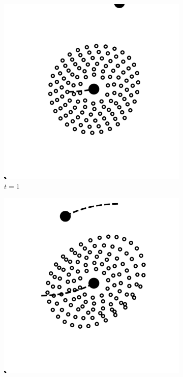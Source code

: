 \documentclass[11pt,twocolumn]{article}
\begin{document}
            \begin{figure}[!htbp]
            \captionsetup[subfigure]{labelformat=empty}
  			\begin{subfigure}[b]{0.2\textwidth}
    			\includegraphics[width=\textwidth]{fig_1/Fig3_1_000000_0.pdf}
    			\caption{$t = 1$}
  			\end{subfigure}
  			\hfill
  			\begin{subfigure}[b]{0.2\textwidth}
    			\includegraphics[width=\textwidth]{fig_1/Fig3_2_000000_0.pdf}

\end{subfigure}
\end{figure}
\end{document}
